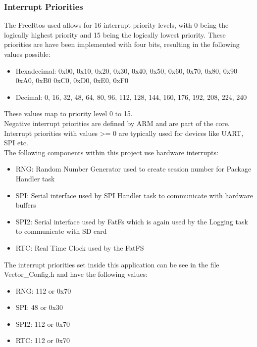 \subsubsection{Interrupt Priorities}
The FreeRtos used allows for 16 interrupt priority levels, with 0 being the logically highest priority and 15 being the logically lowest priority. These priorities are have been implemented with four bits, resulting in the following values possible:
\begin{itemize}
    \item Hexadecimal: 0x00, 0x10, 0x20, 0x30, 0x40, 0x50, 0x60, 0x70, 0x80, 0x90 0xA0, 0xB0 0xC0, 0xD0, 0xE0, 0xF0
    \item Decimal: 0, 16, 32, 48, 64, 80, 96, 112, 128, 144, 160, 176, 192, 208, 224, 240
\end{itemize}
These values map to priority level 0 to 15.\\
Negative interrupt priorities are defined by ARM and are part of the core. Interrupt priorities with values >= 0 are typically used for devices like UART, SPI etc.\\
The following components within this project use hardware interrupts:
\begin{itemize}
    \item RNG: Random Number Generator used to create session number for Package Handler task
    \item SPI: Serial interface used by SPI Handler task to communicate with hardware buffers
    \item SPI2: Serial interface used by FatFs which is again used by the Logging task to communicate with SD card 
    \item RTC: Real Time Clock used by the FatFS
\end{itemize}
The interrupt priorities set inside this application can be see in the file Vector\_Config.h and have the following values:
\begin{itemize}
    \item RNG: 112 or 0x70
    \item SPI: 48 or 0x30
    \item SPI2: 112 or 0x70
    \item RTC: 112 or 0x70
\end{itemize}
%
